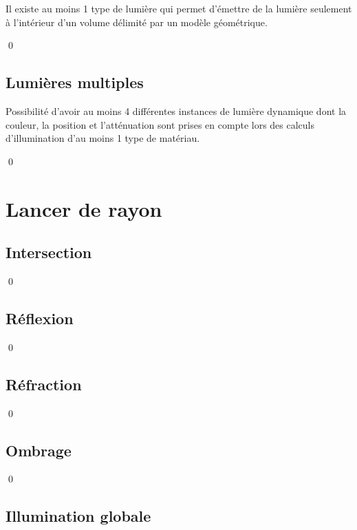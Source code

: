\documentclass[12pt]{article}
\newcommand{\state}{\noindent}
\begin{document}
\state
Il existe au moins 1 type de lumière qui permet d'émettre de la lumière seulement à l'intérieur d'un volume délimité par un modèle géométrique.

\qed

\subsection{Lumières multiples}

\state
Possibilité d'avoir au moins 4 différentes instances de lumière dynamique dont la couleur, la position et l'atténuation sont prises en compte lors des calculs d'illumination d'au moins 1 type de matériau.

\qed

\pagebreak

\section{Lancer de rayon}

\subsection{Intersection}

\state

\qed

\subsection{Réflexion}

\state

\qed

\subsection{Réfraction}

\state

\qed

\subsection{Ombrage}

\state

\qed

\subsection{Illumination globale}

\state
\end{document}
